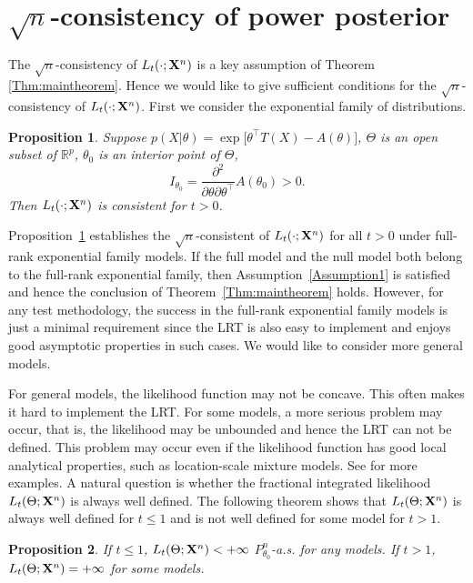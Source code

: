 \documentclass[11pt]{article}
\theoremstyle{plain}
\newtheorem{proposition}{\quad\quad Proposition}
\theoremstyle{definition}
\theoremstyle{remark}
\begin{document}
\section{$\sqrt{n}$-consistency of power posterior}
 The $\sqrt{n}$-consistency of $L_t(\cdot;\mathbf{X}^{n})$ is a key assumption of Theorem \ref{Thm:maintheorem}.
Hence we would like to give sufficient conditions for the $\sqrt{n}$-consistency of $L_t(\cdot;\mathbf{X}^{n})$.
 First we consider the exponential family of distributions.
\begin{proposition}\label{exponentialCon}
    Suppose $p(X|\theta)=\exp\big[\theta^\top  T(X)-A(\theta)\big]$, $\Theta$ is an open subset of $\mathbb{R}^p$, $\theta_0$ is an interior point of $\Theta$, 
    $$I_{\theta_0}=\frac{\partial^2}{\partial \theta \partial \theta^\top } A(\theta_0)>0.$$
    Then $L_{t}(\cdot;\mathbf{X}^{n})$ is consistent for $t>0$.
\end{proposition}

Proposition~\ref{exponentialCon} establishes the $\sqrt{n}$-consistent of $L_t(\cdot;\mathbf{X}^{n})$ for all $t>0$ under full-rank exponential family models.
If the full model and the null model both belong to the full-rank exponential family, then Assumption~\ref{Assumption1} is satisfied and 
hence the conclusion of Theorem~\ref{Thm:maintheorem} holds.
However,
for any test methodology, the success in the full-rank exponential family models is just a minimal requirement 
since the LRT is also easy to implement and enjoys good asymptotic properties in such cases.
We would like to consider more general models.


For general models, the likelihood function may not be concave.
This often makes it hard to implement the LRT.
For some models, a more serious problem may occur, that is, the likelihood may be unbounded and hence the LRT can not be defined.
This problem may occur even if the likelihood function has good local analytical properties, such as location-scale mixture models.  See \cite{Cam1990Maximum} for more examples.
A natural question is whether the fractional integrated likelihood $L_t(\Theta;\mathbf{X}^{n})$ is always well defined.
The following theorem shows that $L_t(\Theta;\mathbf{X}^{n})$ is always well defined for $t\leq 1$ and is not well defined for some model for $t>1$.
\begin{proposition}
    If $t\leq 1$, $L_t(\Theta;\mathbf{X}^{n})< +\infty$ $P_{\theta_0}^n$-a.s. for any models. If $t> 1$, $L_t(\Theta;\mathbf{X}^{n}) = +\infty$ for some models.
    \label{exprop}
\end{proposition}
\end{document}
